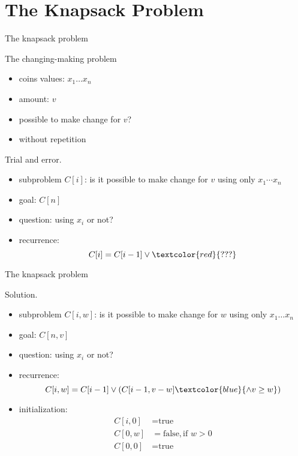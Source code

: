 \section{The Knapsack Problem}

\begin{frame}{The knapsack problem}
  \begin{exampleblock}{The changing-making problem }
    \begin{itemize}
      \item coins values: $x_{1} \dots x_{n}$
      \item amount: $v$
      \item possible to make change for $v$?
      \item without repetition
    \end{itemize}
  \end{exampleblock}

  \begin{alertblock}{Trial and error.}
    \begin{itemize}
      \item subproblem $C[i]$: is it possible to make change for $v$ using only $x_{1} \cdots x_{n}$
      \item goal: $C[n]$
      \item question: using $x_{i}$ or not?
      \item recurrence:
	\[
	  C[i] = C[i-1] \lor \textcolor{red}{???}
	\]
    \end{itemize}
  \end{alertblock}
\end{frame}
\begin{frame}{The knapsack problem}
  \begin{block}{Solution.}
    \begin{itemize}
      \item subproblem $C[i, w]$: is it possible to make change for $w$ using only $x_{1} \dots x_{n}$
      \item goal: $C[n,v]$
      \item question: using $x_{i}$ or not?
      \item recurrence:
	\[
	  C[i,w] = C[i-1] \lor (C[i-1, v-w] \textcolor{blue}{\land v \ge w})
	\]
      \item initialization:
	\begin{align*}
	  C[i,0] &= \text{true}  \\
	  C[0,w] &= \text{false}, \text{if } w > 0 \\
	  C[0,0] &= \text{true}
	\end{align*}
    \end{itemize}
  \end{block}
\end{frame}
